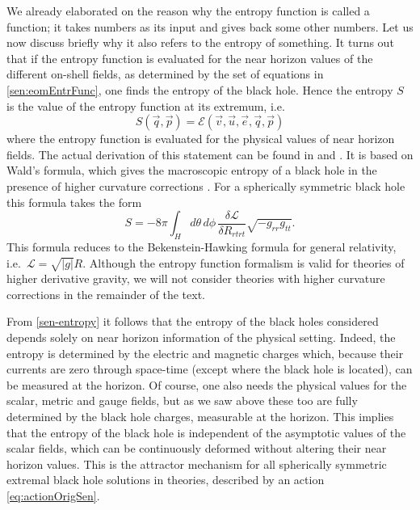 \documentclass[12pt,twoside]{book}
\begin{document}
We already elaborated on the reason why the entropy function is called a function; it takes numbers as its input and gives back some other numbers. Let us now discuss briefly why it also refers to the entropy of something.  It turns out that if the entropy function is evaluated for the near horizon values of the different on-shell fields, as determined by the set of equations in \eqref{sen:eomEntrFunc}, one finds the entropy of the black hole. Hence the entropy $S$ is the value of the entropy function at its extremum, i.e.\
\begin{equation}\label{sen-entropy}
S(\vec{q},\vec{p}) = \mathcal{E}(\vec{v},\vec{u},\vec{e},\vec{q},\vec{p})
\end{equation}
where the entropy function is evaluated for the physical values of near horizon fields.
The actual derivation of this statement can be found in \cite{Sen:2005kx} and \cite{Sen:2007fk}. It is based on Wald's formula, which gives the macroscopic entropy of a black hole in the presence of higher curvature corrections \cite{Wald:1993fk}. For a spherically symmetric black hole this formula takes the form \cite{Sen:2007fk}
\begin{equation}
S = - 8\pi \int_{H} d\theta \, d\phi \, \frac{\delta \mathcal{L}}{\delta R_{rtrt}} \sqrt{-g_{rr}g_{tt}}.
\end{equation}
This formula reduces to the Bekenstein-Hawking formula for general relativity, i.e.\ $\mathcal{L} = \sqrt{|g|}R$. Although the entropy function formalism is valid for theories of higher derivative gravity, we will not consider theories with higher curvature corrections in the remainder of the text.\newline

From \eqref{sen-entropy} it follows that the entropy of the black holes considered depends solely on near horizon information of the physical setting. Indeed, the entropy is determined by the electric and magnetic charges which, because their currents are zero through space-time (except where the black hole is located), can be measured at the horizon. Of course, one also needs the physical values for the scalar, metric and gauge fields, but as we saw above these too are fully determined by the black hole charges, measurable at the horizon. This implies that the entropy of the black hole is independent of the asymptotic values of the scalar fields, which can be continuously deformed without altering their near horizon values. This is the attractor mechanism for all spherically symmetric extremal black hole solutions in theories, described by an action \eqref{eq:actionOrigSen}.
\end{document}
